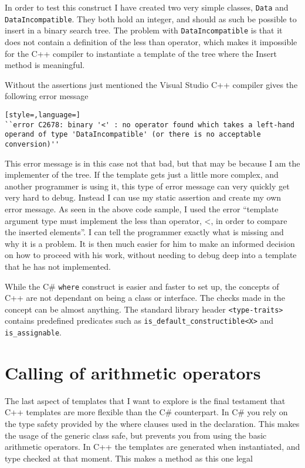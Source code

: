 In order to test this construct I have created two very simple classes, \lstinline|Data| and \lstinline|DataIncompatible|.
They both hold an integer, and should as such be possible to insert in a binary search tree.
The problem with \lstinline|DataIncompatible| is that it does not contain a definition of the less than operator, which makes it impossible for the C++ compiler to instantiate a template of the tree where the Insert method is meaningful.

Without the assertions just mentioned the Visual Studio C++ compiler gives the following error message 

\begin{lstlisting}[style=,language=]
``error C2678: binary '<' : no operator found which takes a left-hand operand of type 'DataIncompatible' (or there is no acceptable conversion)''
\end{lstlisting}

This error message is in this case not that bad, but that may be because I am the implementer of the tree.
If the template gets just a little more complex, and another programmer is using it, this type of error message can very quickly get very hard to debug.
Instead I can use my static assertion and create my own error message. 
As seen in the above code sample, I used the error ``template argument type must implement the less than operator, <, in order to compare the inserted elements''.
I can tell the programmer exactly what is missing and why it is a problem.
It is then much easier for him to make an informed decision on how to proceed with his work, without needing to debug deep into a template that he has not implemented.

While the C\# \texttt{where} construct is easier and faster to set up, the concepts of C++ are not dependant on being a class or interface. 
The checks made in the concept can be almost anything.
The standard library header \lstinline|<type-traits>| contains predefined predicates such as \lstinline|is_default_constructible<X>| and \lstinline|is_assignable|.

\section{Calling of arithmetic operators}
The last aspect of templates that I want to explore is the final testament that C++ templates are more flexible than the C\# counterpart.
In C\# you rely on the type safety provided by the where clauses used in the declaration.
This makes the usage of the generic class safe, but prevents you from using the basic arithmetic operators. 
In C++ the templates are generated when instantiated, and type checked at that moment.
This makes a method as this one legal

